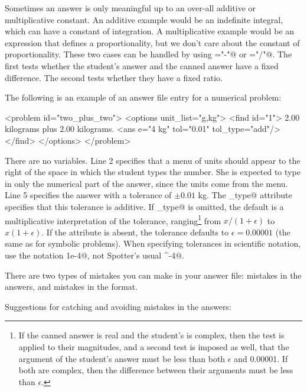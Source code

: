 \documentclass{doc}
\begin{document}
Sometimes an answer is only meaningful up to an over-all additive or multiplicative constant.
An additive example would be an indefinite integral, which can have a constant of integration.
A multiplicative example would be an expression that defines a proportionality, but we don't
care about the constant of proportionality. These two cases can be handled by using
\verb@filter="-"@ or \verb@filter="/"@. The first tests whether the student's answer and
the canned answer have a fixed difference. The second tests whether they have a fixed
ratio.

The following is an example of an answer file entry for a numerical
problem:
\begin{listing}{1}
  <problem id="two_plus_two">
    <options unit_list="g,kg">
      <find id="1">
        2.00 kilograms plus 2.00 kilograms.
        <ans e="4 kg" tol="0.01" tol_type="add"/>
      </find>
    </options>
  </problem>
\end{listing}

There are no variables. Line 2 specifies that a menu of units should
appear to the right of the space in which the student types the number.
She is expected to type in only the numerical part of the answer, since
the units come from the menu. Line 5 specifies the answer with
a tolerance of $\pm0.01$ kg. The \verb@tol_type@ attribute specifies
that this tolerance is additive. If \verb@tol_type@ is omitted,
the default is a multiplicative interpretation of the tolerance,
ranging\footnote{If the canned answer is real and the student's
is complex, then the test is applied to their magnitudes, and
a second test is imposed as well, that the argument of the student's answer must be
less than both $\epsilon$ and 0.00001. If both are complex, then the
difference between their
arguments must be less than $\epsilon$.}
 from $x/(1+\epsilon)$ to $x(1+\epsilon)$.
 If the \verb@tol@ attribute is
absent, the tolerance defaults to $\epsilon=0.00001$ (the same as for symbolic problems).
When specifying tolerances in scientific notation, use the notation
\verb@1e-4@, not Spotter's usual ^-4@.

\label{debugginganswerfile}
There are two types of mistakes you can make in your answer file: mistakes in the
answers, and mistakes in the format. 

Suggestions for catching and avoiding
mistakes in the answers:
\end{document}
